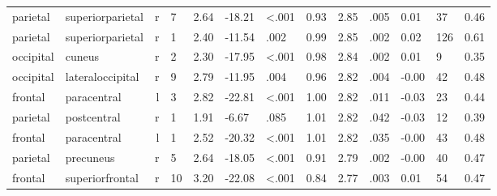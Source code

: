 \documentclass{article}
\begin{document}
\begin{longtable}{llrR{1.3cm}R{1cm}R{1.3cm}R{1cm}R{1cm}R{1.3cm}R{1cm}R{1.8cm}R{1.3cm}R{1.8cm}}
  parietal &          superiorparietal &    r &         7 &                  2.64 &           -18.21 &      \textless.001 &                               0.93 &                          2.85 &                            .005 &   0.01 &     37 &      0.46 \\
  parietal &          superiorparietal &    r &         1 &                  2.40 &           -11.54 &               .002 &                               0.99 &                          2.85 &                            .002 &   0.02 &    126 &      0.61 \\
 occipital &                    cuneus &    r &         2 &                  2.30 &           -17.95 &      \textless.001 &                               0.98 &                          2.84 &                            .002 &   0.01 &      9 &      0.35 \\
 occipital &          lateraloccipital &    r &         9 &                  2.79 &           -11.95 &               .004 &                               0.96 &                          2.82 &                            .004 &  -0.00 &     42 &      0.48 \\
   frontal &               paracentral &    l &         3 &                  2.82 &           -22.81 &      \textless.001 &                               1.00 &                          2.82 &                            .011 &  -0.03 &     23 &      0.44 \\
  parietal &               postcentral &    r &         1 &                  1.91 &            -6.67 &               .085 &                               1.01 &                          2.82 &                            .042 &  -0.03 &     12 &      0.39 \\
   frontal &               paracentral &    l &         1 &                  2.52 &           -20.32 &      \textless.001 &                               1.01 &                          2.82 &                            .035 &  -0.00 &     43 &      0.48 \\
  parietal &                 precuneus &    r &         5 &                  2.64 &           -18.05 &      \textless.001 &                               0.91 &                          2.79 &                            .002 &  -0.00 &     40 &      0.47 \\
   frontal &           superiorfrontal &    r &        10 &                  3.20 &           -22.08 &      \textless.001 &                               0.84 &                          2.77 &                            .003 &   0.01 &     54 &      0.47 \\

\end{longtable}
\end{document}
